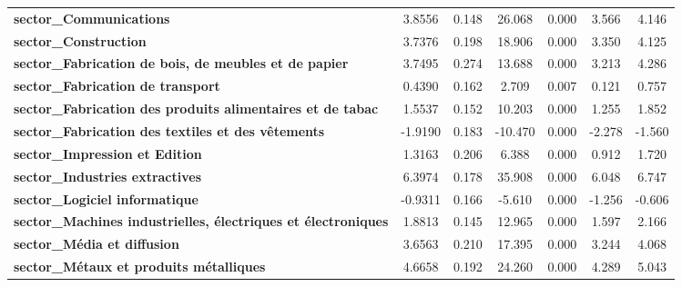 \begin{center}
\begin{tabular}{lcccccc}
\textbf{sector\_Communications}                                       &       3.8556  &        0.148     &    26.068  &         0.000        &        3.566    &        4.146     \\
\textbf{sector\_Construction}                                         &       3.7376  &        0.198     &    18.906  &         0.000        &        3.350    &        4.125     \\
\textbf{sector\_Fabrication de bois, de meubles et de papier}         &       3.7495  &        0.274     &    13.688  &         0.000        &        3.213    &        4.286     \\
\textbf{sector\_Fabrication de transport}                             &       0.4390  &        0.162     &     2.709  &         0.007        &        0.121    &        0.757     \\
\textbf{sector\_Fabrication des produits alimentaires et de tabac}    &       1.5537  &        0.152     &    10.203  &         0.000        &        1.255    &        1.852     \\
\textbf{sector\_Fabrication des textiles et des vêtements}            &      -1.9190  &        0.183     &   -10.470  &         0.000        &       -2.278    &       -1.560     \\
\textbf{sector\_Impression et Edition}                                &       1.3163  &        0.206     &     6.388  &         0.000        &        0.912    &        1.720     \\
\textbf{sector\_Industries extractives}                               &       6.3974  &        0.178     &    35.908  &         0.000        &        6.048    &        6.747     \\
\textbf{sector\_Logiciel informatique}                                &      -0.9311  &        0.166     &    -5.610  &         0.000        &       -1.256    &       -0.606     \\
\textbf{sector\_Machines industrielles, électriques et électroniques} &       1.8813  &        0.145     &    12.965  &         0.000        &        1.597    &        2.166     \\
\textbf{sector\_Média et diffusion}                                   &       3.6563  &        0.210     &    17.395  &         0.000        &        3.244    &        4.068     \\
\textbf{sector\_Métaux et produits métalliques}                       &       4.6658  &        0.192     &    24.260  &         0.000        &        4.289    &        5.043     \\

\end{tabular}
\end{center}
